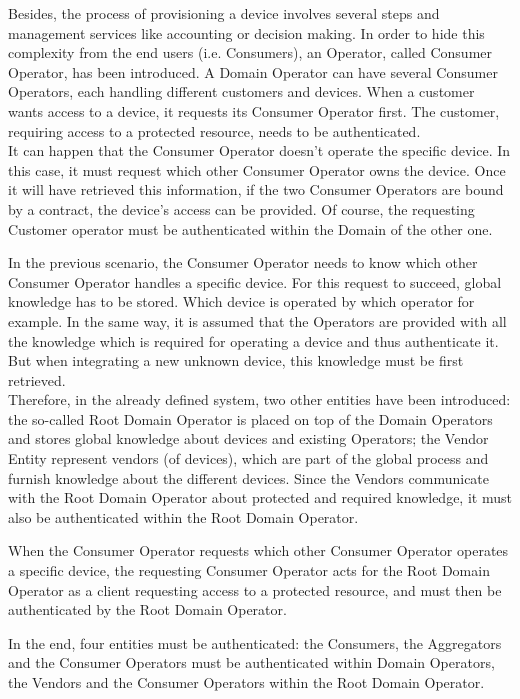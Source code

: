Besides, the process of provisioning a device involves several steps and management services like accounting or decision making. In order to hide this complexity from the end users (i.e. Consumers), an Operator, called Consumer Operator, has been introduced. A Domain Operator can have several Consumer Operators, each handling different customers and devices. When a customer wants access to a device, it requests its Consumer Operator first. The customer, requiring access to a protected resource, needs to be authenticated. 
\\It can happen that the Consumer Operator doesn't operate the specific device. In this case, it must request which other Consumer Operator owns the device. Once it will have retrieved this information, if the two Consumer Operators are bound by a contract, the device's access can be provided. Of course, the requesting Customer operator must be authenticated within the Domain of the other one.

In the previous scenario, the Consumer Operator needs to know which other Consumer Operator handles a specific device. For this request to succeed, global knowledge has to be stored. Which device is operated by which operator for example. In the same way, it is assumed that the Operators are provided with all the knowledge which is required for operating a device and thus authenticate it. But when integrating a new unknown device, this knowledge must be first retrieved. \\Therefore, in the already defined system, two other entities have been introduced: the so-called Root Domain Operator is placed on top of the Domain Operators and stores global knowledge about devices and existing Operators; the Vendor Entity represent vendors (of devices), which are part of the global process and furnish knowledge about the different devices. Since the Vendors communicate with the Root Domain Operator about protected and required knowledge, it must also be authenticated within the Root Domain Operator. 

When the Consumer Operator requests which other Consumer Operator operates a specific device, the requesting Consumer Operator acts for the Root Domain Operator as a client requesting access to a protected resource, and must then be authenticated by the Root Domain Operator.

In the end, four entities must be authenticated: the Consumers, the Aggregators and the Consumer Operators must be authenticated within Domain Operators, the Vendors and the Consumer Operators within the Root Domain Operator.

